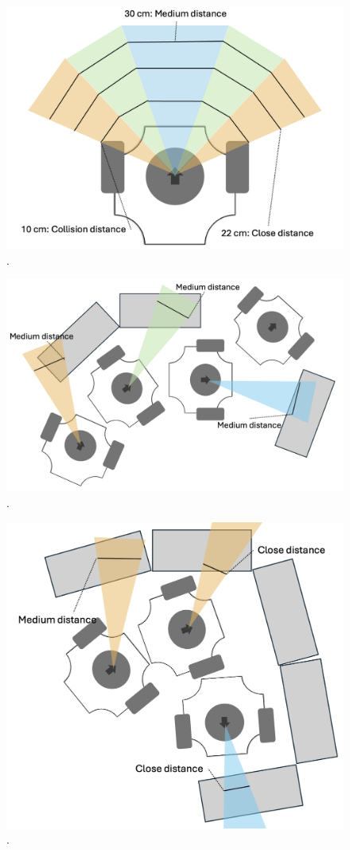 \documentclass[conference]{IEEEtran}
\begin{document}
\begin{figure}[htbp]
    \centerline{\includegraphics[width=0.9\columnwidth]{Pictures/LiDAR Distances.png}}
    \caption{.}
    \label{sec:distances}
    \end{figure}
\begin{figure}[htbp]
    \centerline{\includegraphics[width=0.9\columnwidth]{Pictures/Medium Distance Aviodance.png}}
    \caption{.}
    \label{sec:medium aviodance}
    \end{figure}
\begin{figure}[htbp]
    \centerline{\includegraphics[width=0.9\columnwidth]{Pictures/Close Distance Avoidance.png}}
    \caption{.}
    \label{sec:close aviodance}
    \end{figure}
\end{document}
